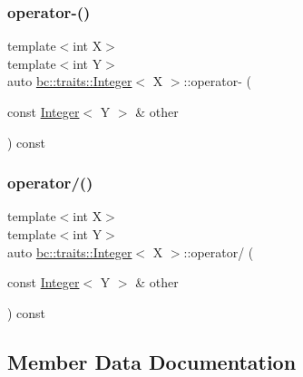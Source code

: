 \mbox{\label{structbc_1_1traits_1_1Integer_aa240f8d636f107e7acf4682855bc377e}} 
\subsubsection{\texorpdfstring{operator-\/()}{operator-()}}
{\footnotesize\ttfamily template$<$int X$>$ \\
template$<$int Y$>$ \\
auto \hyperlink{structbc_1_1traits_1_1Integer}{bc\+::traits\+::\+Integer}$<$ X $>$\+::operator-\/ (\begin{DoxyParamCaption}\item[{const \hyperlink{structbc_1_1traits_1_1Integer}{Integer}$<$ Y $>$ \&}]{other }\end{DoxyParamCaption}) const\hspace{0.3cm}{\ttfamily [inline]}}

\mbox{\label{structbc_1_1traits_1_1Integer_a8358e03217a8556e1b9094641fec4d3a}} 
\subsubsection{\texorpdfstring{operator/()}{operator/()}}
{\footnotesize\ttfamily template$<$int X$>$ \\
template$<$int Y$>$ \\
auto \hyperlink{structbc_1_1traits_1_1Integer}{bc\+::traits\+::\+Integer}$<$ X $>$\+::operator/ (\begin{DoxyParamCaption}\item[{const \hyperlink{structbc_1_1traits_1_1Integer}{Integer}$<$ Y $>$ \&}]{other }\end{DoxyParamCaption}) const\hspace{0.3cm}{\ttfamily [inline]}}



\subsection{Member Data Documentation}
\mbox{\label{structbc_1_1traits_1_1Integer_a853b05936b98e64c79163395c3624e32}} 
